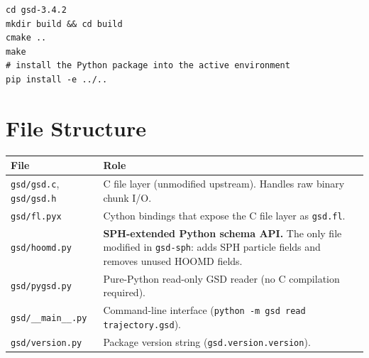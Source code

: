\documentclass[10pt,a4paper]{article}
\begin{document}
\begin{lstlisting}[style=bash]
cd gsd-3.4.2
mkdir build && cd build
cmake ..
make
# install the Python package into the active environment
pip install -e ../..
\end{lstlisting}

\section{File Structure}

\begin{center}
\small
\begin{tabular}{@{}lp{9cm}@{}}
\toprule
\textbf{File} & \textbf{Role}\\
\midrule
\texttt{gsd/gsd.c}, \texttt{gsd/gsd.h}
  & C file layer (unmodified upstream). Handles raw binary chunk I/O.\\
\texttt{gsd/fl.pyx}
  & Cython bindings that expose the C file layer as \texttt{gsd.fl}.\\
\texttt{gsd/hoomd.py}
  & \textbf{SPH-extended Python schema API.} The only file modified in
    \texttt{gsd-sph}: adds SPH particle fields and removes unused HOOMD fields.\\
\texttt{gsd/pygsd.py}
  & Pure-Python read-only GSD reader (no C compilation required).\\
\texttt{gsd/\_\_main\_\_.py}
  & Command-line interface (\texttt{python -m gsd read trajectory.gsd}).\\
\texttt{gsd/version.py}
  & Package version string (\texttt{gsd.version.version}).\\
\bottomrule
\end{tabular}
\end{center}
\end{document}
